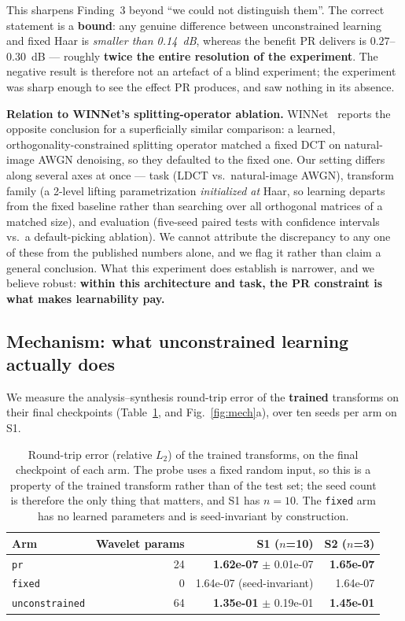 \documentclass[conference]{IEEEtran}
\begin{document}
This sharpens Finding~3 beyond ``we could not distinguish them''. The correct
statement is a \textbf{bound}: any genuine difference between unconstrained
learning and fixed Haar is \emph{smaller than 0.14~dB}, whereas the benefit PR
delivers is $0.27$--$0.30$~dB --- roughly \textbf{twice the entire resolution of
the experiment}. The negative result is therefore not an artefact of a blind
experiment; the experiment was sharp enough to see the effect PR produces, and
saw nothing in its absence.

\textbf{Relation to WINNet's splitting-operator ablation.}
WINNet~\cite{huang2022winnet} reports the opposite conclusion for a superficially
similar comparison: a learned, orthogonality-constrained splitting operator
matched a fixed DCT on natural-image AWGN denoising, so they defaulted to the
fixed one. Our setting differs along several axes at once --- task (LDCT vs.\
natural-image AWGN), transform family (a 2-level lifting parametrization
\emph{initialized at} Haar, so learning departs from the fixed baseline rather
than searching over all orthogonal matrices of a matched size), and evaluation
(five-seed paired tests with confidence intervals vs.\ a default-picking
ablation). We cannot attribute the discrepancy to any one of these from the
published numbers alone, and we flag it rather than claim a general conclusion.
What this experiment does establish is narrower, and we believe robust:
\textbf{within this architecture and task, the PR constraint is what makes
learnability pay.}

\subsection{Mechanism: what unconstrained learning actually does}
\label{sec:mech}

We measure the analysis--synthesis round-trip error of the \textbf{trained}
transforms on their final checkpoints (Table~\ref{tab:rt}, and
Fig.~\ref{fig:mech}a), over ten seeds per arm on S1.

\begin{table}[t]
\centering
\caption{Round-trip error (relative $L_2$) of the trained transforms, on the
final checkpoint of each arm. The probe uses a fixed random input, so this is a
property of the trained transform rather than of the test set; the seed count is
therefore the only thing that matters, and S1 has $n=10$. The \texttt{fixed} arm
has no learned parameters and is seed-invariant by construction.}
\label{tab:rt}
\small
\begin{tabular}{@{}lrrr@{}}
\toprule
Arm & Wavelet params & S1 ($n$=10) & S2 ($n$=3)\\
\midrule
\texttt{pr} & 24 & \textbf{1.62e-07} $\pm$ 0.01e-07 & \textbf{1.65e-07}\\
\texttt{fixed} & 0 & 1.64e-07 (seed-invariant) & 1.64e-07\\
\texttt{unconstrained} & 64 & \textbf{1.35e-01} $\pm$ 0.19e-01 & \textbf{1.45e-01}\\
\bottomrule
\end{tabular}
\end{table}
\end{document}
